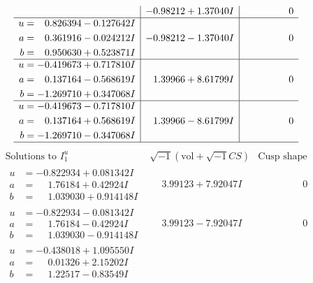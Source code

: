 \documentclass[1p]{elsarticle_modified}
\theoremstyle{definition}
\newcommand{\I}{\sqrt{-1}}
\begin{document}
$$\begin{array}{c|c|c}
 & -0.98212 + 1.37040 I & \phantom{-0.000000 } 0 \\ \hline\begin{aligned}
u &= \phantom{-}0.826394 - 0.127642 I \\
a &= \phantom{-}0.361916 - 0.024212 I \\
b &= \phantom{-}0.950630 + 0.523871 I\end{aligned}
 & -0.98212 - 1.37040 I & \phantom{-0.000000 } 0 \\ \hline\begin{aligned}
u &= -0.419673 + 0.717810 I \\
a &= \phantom{-}0.137164 - 0.568619 I \\
b &= -1.269710 + 0.347068 I\end{aligned}
 & \phantom{-}1.39966 + 8.61799 I & \phantom{-0.000000 } 0 \\ \hline\begin{aligned}
u &= -0.419673 - 0.717810 I \\
a &= \phantom{-}0.137164 + 0.568619 I \\
b &= -1.269710 - 0.347068 I\end{aligned}
 & \phantom{-}1.39966 - 8.61799 I & \phantom{-0.000000 } 0\\
 \hline 
 \end{array}$$\newpage$$\begin{array}{c|c|c}  
\text{Solutions to }I^u_{1}& \I (\text{vol} + \sqrt{-1}CS) & \text{Cusp shape}\\
 \hline 
\begin{aligned}
u &= -0.822934 + 0.081342 I \\
a &= \phantom{-}1.76184 + 0.42924 I \\
b &= \phantom{-}1.039030 + 0.914148 I\end{aligned}
 & \phantom{-}3.99123 + 7.92047 I & \phantom{-0.000000 } 0 \\ \hline\begin{aligned}
u &= -0.822934 - 0.081342 I \\
a &= \phantom{-}1.76184 - 0.42924 I \\
b &= \phantom{-}1.039030 - 0.914148 I\end{aligned}
 & \phantom{-}3.99123 - 7.92047 I & \phantom{-0.000000 } 0 \\ \hline\begin{aligned}
u &= -0.438018 + 1.095550 I \\
a &= \phantom{-}0.01326 + 2.15202 I \\
b &= \phantom{-}1.22517 - 0.83549 I\end{aligned}

\end{array}$$
\end{document}
